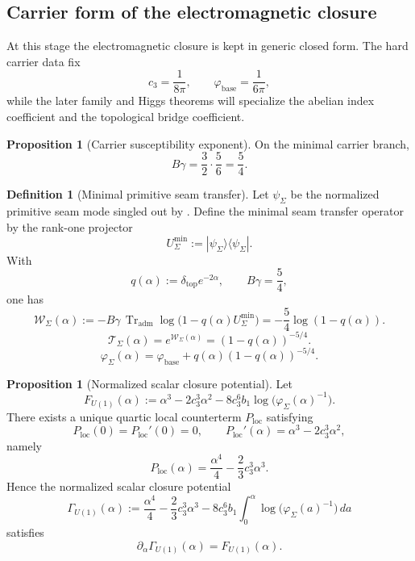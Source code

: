 \documentclass[11pt,a4paper]{article}
\theoremstyle{definition}
\newtheorem{definition}[theorem]{Definition}
\newtheorem{proposition}[theorem]{Proposition}
\theoremstyle{remark}
\DeclareMathOperator{\tr}{Tr}
\newcommand{\cthree}{c_3}
\newcommand{\phibase}{\varphi_{\mathrm{base}}}
\newcommand{\phiseam}{\varphi_{\Sigma}}
\newcommand{\deltatop}{\delta_{\mathrm{top}}}
\begin{document}
\subsection{Carrier form of the electromagnetic closure}

At this stage the electromagnetic closure is kept in generic closed form. The hard carrier data
fix
\[
\cthree=\frac{1}{8\pi},
\qquad
\phibase=\frac{1}{6\pi},
\]
while the later family and Higgs theorems will specialize the abelian index coefficient and the
topological bridge coefficient.

\begin{proposition}[Carrier susceptibility exponent]
\label{prop:carrier-susceptibility-exponent}
On the minimal carrier branch,
\[
B\gamma=\frac32\cdot\frac56=\frac54.
\]
\end{proposition}
\begin{definition}[Minimal primitive seam transfer]
\label{def:exact-seam-generating-function}
Let $\psi_{\Sigma}$ be the normalized primitive seam mode singled out by
. Define the minimal seam transfer operator by the rank-one
projector
\[
U_{\Sigma}^{\min}:=|\psi_{\Sigma}\rangle\langle\psi_{\Sigma}|.
\]
With
\[
q(\alpha):=\deltatop e^{-2\alpha},
\qquad
B\gamma=\frac54,
\]
one has
\[
\mathcal W_{\Sigma}(\alpha)
:=
-B\gamma\,\tr_{\mathrm{adm}}\log\!\bigl(1-q(\alpha)U_{\Sigma}^{\min}\bigr)
=-\frac54\log(1-q(\alpha)).
\]
\[
\mathcal T_{\Sigma}(\alpha)=e^{\mathcal W_{\Sigma}(\alpha)}=(1-q(\alpha))^{-5/4}.
\]
\begin{equation}
\label{eq:phi-opening}
\phiseam(\alpha)=\phibase+q(\alpha)(1-q(\alpha))^{-5/4}.
\end{equation}
\end{definition}

\begin{proposition}[Normalized scalar closure potential]
\label{prop:log-det-variation-u1}
Let
\[
F_{U(1)}(\alpha):=\alpha^3-2\cthree^3\alpha^2-8\cthree^6 b_1\log\bigl(\phiseam(\alpha)^{-1}\bigr).
\]
There exists a unique quartic local counterterm $P_{\mathrm{loc}}$ satisfying
\[
P_{\mathrm{loc}}(0)=P_{\mathrm{loc}}'(0)=0,
\qquad
P_{\mathrm{loc}}'(\alpha)=\alpha^3-2\cthree^3\alpha^2,
\]
namely
\[
P_{\mathrm{loc}}(\alpha)=\frac{\alpha^4}{4}-\frac23\cthree^3\alpha^3.
\]
Hence the normalized scalar closure potential
\[
\Gamma_{U(1)}(\alpha)
:=
\frac{\alpha^4}{4}-\frac23\cthree^3\alpha^3
-8\cthree^6 b_1\int_0^\alpha \log\bigl(\phiseam(a)^{-1}\bigr)\,da
\]
satisfies
\[
\partial_{\alpha}\Gamma_{U(1)}(\alpha)=F_{U(1)}(\alpha).
\]
\end{proposition}
\end{document}
